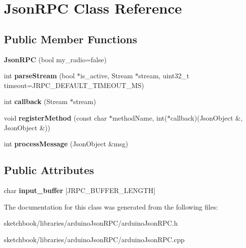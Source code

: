 \hypertarget{classJsonRPC}{}\section{Json\+R\+PC Class Reference}
\label{classJsonRPC}
\subsection*{Public Member Functions}
\begin{DoxyCompactItemize}
\item 
\mbox{\label{classJsonRPC_a617c430786b5dbce52a312ef80c3957b}} 
{\bfseries Json\+R\+PC} (bool my\+\_\+radio=false)
\item 
\mbox{\label{classJsonRPC_aae0b81ab3de6cf64c72e0330291555b9}} 
int {\bfseries parse\+Stream} (bool $\ast$is\+\_\+active, Stream $\ast$stream, uint32\+\_\+t timeout=J\+R\+P\+C\+\_\+\+D\+E\+F\+A\+U\+L\+T\+\_\+\+T\+I\+M\+E\+O\+U\+T\+\_\+\+MS)
\item 
\mbox{\label{classJsonRPC_a011e5dec59c8ef72a3ffe08442afa98c}} 
int {\bfseries callback} (Stream $\ast$stream)
\item 
\mbox{\label{classJsonRPC_a2d24ec53b8142bb542a3ab89bf56dd22}} 
void {\bfseries register\+Method} (const char $\ast$method\+Name, int($\ast$callback)(Json\+Object \&, Json\+Object \&))
\item 
\mbox{\label{classJsonRPC_a6ce8b0716779077a3decf3a0e928308c}} 
int {\bfseries process\+Message} (Json\+Object \&msg)
\end{DoxyCompactItemize}
\subsection*{Public Attributes}
\begin{DoxyCompactItemize}
\item 
\mbox{\label{classJsonRPC_a7dee13a51ff802762e2130d19c5ed3b9}} 
char {\bfseries input\+\_\+buffer} \mbox{[}J\+R\+P\+C\+\_\+\+B\+U\+F\+F\+E\+R\+\_\+\+L\+E\+N\+G\+TH\mbox{]}
\end{DoxyCompactItemize}


The documentation for this class was generated from the following files\+:\begin{DoxyCompactItemize}
\item 
sketchbook/libraries/arduino\+Json\+R\+P\+C/arduino\+Json\+R\+P\+C.\+h\item 
sketchbook/libraries/arduino\+Json\+R\+P\+C/arduino\+Json\+R\+P\+C.\+cpp\end{DoxyCompactItemize}
